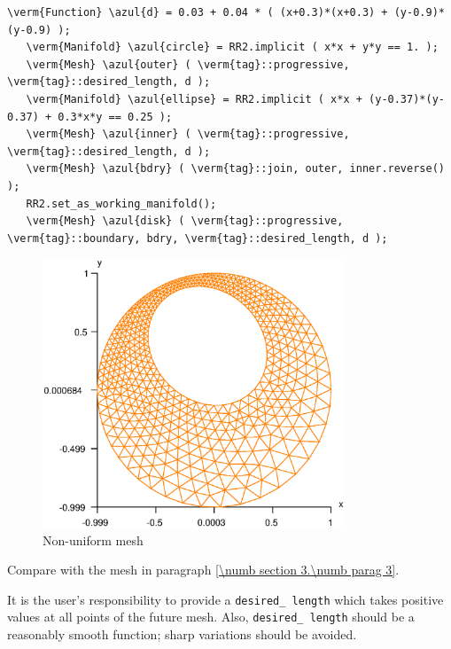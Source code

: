 \begin{Verbatim}[commandchars=\\\{\},formatcom=\small\tt,frame=single,
   label=parag-\ref{\numb section 3.\numb parag 22}.cpp,rulecolor=\color{coment},
   baselinestretch=0.94,framesep=2mm                                            ]
   \verm{Function} \azul{d} = 0.03 + 0.04 * ( (x+0.3)*(x+0.3) + (y-0.9)*(y-0.9) );
   \verm{Manifold} \azul{circle} = RR2.implicit ( x*x + y*y == 1. );
   \verm{Mesh} \azul{outer} ( \verm{tag}::progressive, \verm{tag}::desired_length, d );
   \verm{Manifold} \azul{ellipse} = RR2.implicit ( x*x + (y-0.37)*(y-0.37) + 0.3*x*y == 0.25 );
   \verm{Mesh} \azul{inner} ( \verm{tag}::progressive, \verm{tag}::desired_length, d );
   \verm{Mesh} \azul{bdry} ( \verm{tag}::join, outer, inner.reverse() );
   RR2.set_as_working_manifold();
   \verm{Mesh} \azul{disk} ( \verm{tag}::progressive, \verm{tag}::boundary, bdry, \verm{tag}::desired_length, d );
\end{Verbatim}

\begin{figure}[ht] \centering
 \includegraphics[width=90mm]{disk-non-unif}
  \caption{Non-uniform mesh}
  \label{\numb section 3.\numb fig 10}
\end{figure}

Compare with the mesh in paragraph \ref{\numb section 3.\numb parag 3}.

It is the user's responsibility to provide a {\small\tt desired\_\,length} which takes positive
values at all points of the future mesh.
Also, {\small\tt desired\_\,length} should be a reasonably smooth function;
sharp variations should be avoided.


\section{~~}\label{\numb section 3.\numb parag 23}
 

